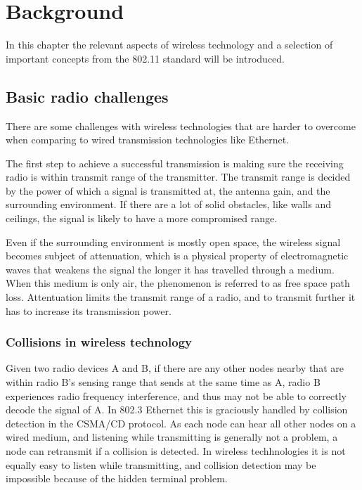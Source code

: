 \chapter{Background}
In this chapter the relevant aspects of wireless technology and a selection of important
concepts from the 802.11 standard will be introduced.

\section{Basic radio challenges}
There are some challenges with wireless technologies that are harder to overcome when comparing to wired transmission technologies like Ethernet.

The first step to achieve a successful transmission is making sure the receiving radio is within transmit range of the transmitter. The
transmit range is decided by the power of which a signal is transmitted at, the antenna gain, and the surrounding 
environment. If there are a lot of solid obstacles, like walls and ceilings, the signal is likely to have a more compromised range.

Even if the surrounding environment is mostly open space, the wireless signal becomes subject of attenuation,
     which is a physical property of electromagnetic waves that weakens the signal the longer it has travelled through a
     medium. When this medium is only air, the phenomenon is referred to as free space path loss. Attentuation limits
     the transmit range of a radio, and to transmit further it has to increase its transmission power.

     \subsection{Collisions in wireless technology}
     Given two radio devices A and B, if there are any other nodes nearby that are within radio B's sensing range that sends at the same time as A, 
     radio B experiences radio frequency interference, and thus may not be able to correctly decode the signal of A. In 802.3 Ethernet this
     is graciously handled by collision detection in the CSMA/CD protocol. As each node can hear all other nodes on a wired medium,
     and listening while transmitting is generally not a problem, a node can retransmit if a collision is detected. In wireless techhnologies
     it is not equally easy to listen while transmitting, and collision detection may be impossible because of the hidden terminal problem.

